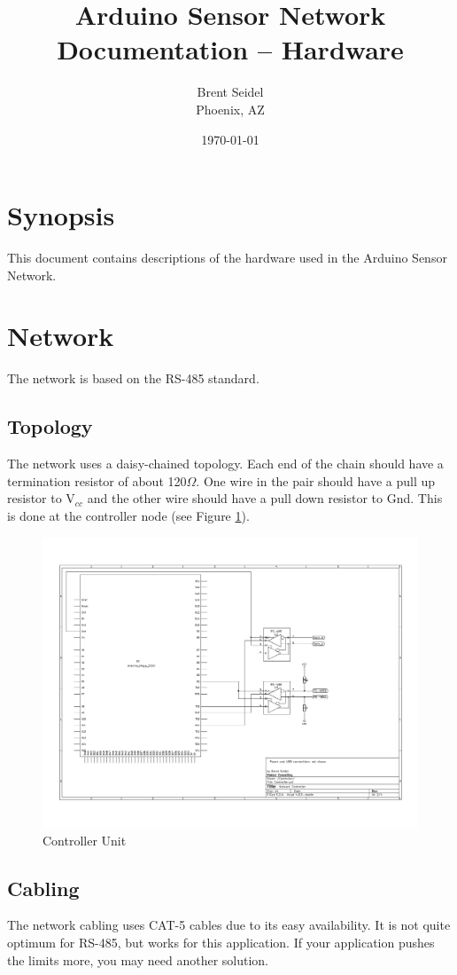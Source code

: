 \documentclass[10pt]{article}
\title{Arduino Sensor Network Documentation -- Hardware}
\author{Brent Seidel \\ Phoenix, AZ}
\date{ \today }
\begin{document}
\maketitle

\section{Synopsis}
This document contains descriptions of the hardware used in the Arduino Sensor Network.

\section{Network}
The network is based on the RS-485 standard.

\subsection{Topology}
The network uses a daisy-chained topology.  Each end of the chain should have a termination resistor of about 120$\Omega$.  One wire in the pair should have a pull up resistor to V$_{cc}$ and the other wire should have a pull down resistor to Gnd.  This is done at the controller node (see Figure \ref{fig:controller}).

\begin{figure}
  \centering
  \includegraphics[width=\textwidth]{ControllerUnit.pdf}
  \caption{Controller Unit}
  \label{fig:controller}
\end{figure}

\subsection{Cabling}
The network cabling uses CAT-5 cables due to its easy availability.  It is not quite optimum for RS-485, but works for this application.  If your application pushes the limits more, you may need another solution.
\end{document}
